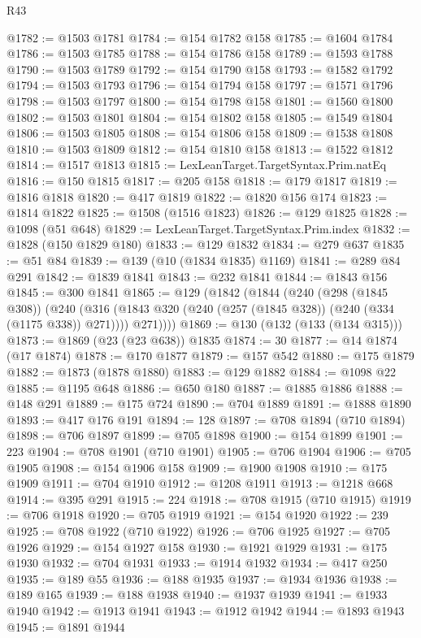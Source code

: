 \begin{lexlean}{R43}
\begin{coremodule}
@1782 := @1503 @1781
@1784 := @154 @1782 @158
@1785 := @1604 @1784
@1786 := @1503 @1785
@1788 := @154 @1786 @158
@1789 := @1593 @1788
@1790 := @1503 @1789
@1792 := @154 @1790 @158
@1793 := @1582 @1792
@1794 := @1503 @1793
@1796 := @154 @1794 @158
@1797 := @1571 @1796
@1798 := @1503 @1797
@1800 := @154 @1798 @158
@1801 := @1560 @1800
@1802 := @1503 @1801
@1804 := @154 @1802 @158
@1805 := @1549 @1804
@1806 := @1503 @1805
@1808 := @154 @1806 @158
@1809 := @1538 @1808
@1810 := @1503 @1809
@1812 := @154 @1810 @158
@1813 := @1522 @1812
@1814 := @1517 @1813
@1815 := LexLeanTarget.TargetSyntax.Prim.natEq
@1816 := @150 @1815
@1817 := @205 @158
@1818 := @179 @1817
@1819 := @1816 @1818
@1820 := @417 @1819
@1822 := @1820 @156 @174
@1823 := @1814 @1822
@1825 := @1508 (@1516 @1823)
@1826 := @129 @1825
@1828 := @1098 (@51 @648)
@1829 := LexLeanTarget.TargetSyntax.Prim.index
@1832 := @1828 (@150 @1829 @180)
@1833 := @129 @1832
@1834 := @279 @637
@1835 := @51 @84
@1839 := @139 (@10 (@1834 @1835) @1169)
@1841 := @289 @84 @291
@1842 := @1839 @1841
@1843 := @232 @1841
@1844 := @1843 @156
@1845 := @300 @1841
@1865 := @129
    (@1842
      (@1844
        (@240
          (@298 (@1845 @308))
          (@240
            (@316 (@1843 @320 (@240 (@257 (@1845 @328)) (@240 (@334 (@1175 @338)) @271))))
            @271))))
@1869 := @130 (@132 (@133 (@134 @315)))
@1873 := @1869 (@23 (@23 @638)) @1835
@1874 := 30
@1877 := @14 @1874 (@17 @1874)
@1878 := @170 @1877
@1879 := @157 @542
@1880 := @175 @1879
@1882 := @1873 (@1878 @1880)
@1883 := @129 @1882
@1884 := @1098 @22
@1885 := @1195 @648
@1886 := @650 @180
@1887 := @1885 @1886
@1888 := @148 @291
@1889 := @175 @724
@1890 := @704 @1889
@1891 := @1888 @1890
@1893 := @417 @176 @191
@1894 := 128
@1897 := @708 @1894 (@710 @1894)
@1898 := @706 @1897
@1899 := @705 @1898
@1900 := @154 @1899
@1901 := 223
@1904 := @708 @1901 (@710 @1901)
@1905 := @706 @1904
@1906 := @705 @1905
@1908 := @154 @1906 @158
@1909 := @1900 @1908
@1910 := @175 @1909
@1911 := @704 @1910
@1912 := @1208 @1911
@1913 := @1218 @668
@1914 := @395 @291
@1915 := 224
@1918 := @708 @1915 (@710 @1915)
@1919 := @706 @1918
@1920 := @705 @1919
@1921 := @154 @1920
@1922 := 239
@1925 := @708 @1922 (@710 @1922)
@1926 := @706 @1925
@1927 := @705 @1926
@1929 := @154 @1927 @158
@1930 := @1921 @1929
@1931 := @175 @1930
@1932 := @704 @1931
@1933 := @1914 @1932
@1934 := @417 @250
@1935 := @189 @55
@1936 := @188 @1935
@1937 := @1934 @1936
@1938 := @189 @165
@1939 := @188 @1938
@1940 := @1937 @1939
@1941 := @1933 @1940
@1942 := @1913 @1941
@1943 := @1912 @1942
@1944 := @1893 @1943
@1945 := @1891 @1944

\end{coremodule}
\end{lexlean}
